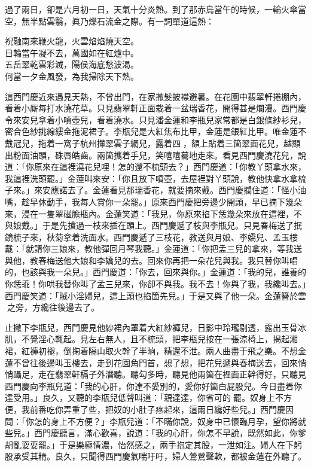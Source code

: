 過了兩日，卻是六月初一日，天氣十分炎熱。到了那赤烏當午的時候，一輪火傘當空，無半點雲翳，眞乃爍石流金之際。有一詞單道這熱：

\begin{myquote}
祝融南來鞭火龍，火雲焰焰燒天空。\\日輪當午凝不去，萬國如在紅爐中。\\五岳翠乾雲彩滅，陽侯海底愁波渴。\\何當一夕金風發，為我掃除天下熱。
\end{myquote}

這西門慶近來遇見天熱，不曾出門，在家撒髮披襟避暑。{}在花園中翡翠軒捲棚內，看着小厮每打水澆花草。只見翡翠軒正面栽着一盆瑞香花，開得甚是爛漫。西門慶令來安兒拿着小噴壺兒，看着澆水。只見潘金蓮和李瓶兒家常都是白銀條紗衫兒，密合色紗挑線縷金拖泥裙子。李瓶兒是大紅焦布比甲，金蓮是銀紅比甲。唯金蓮不戴冠兒，拖着一窩子杭州攆翠雲子網兒，露着四𩬆，額上貼着三箇翠面花兒，越顯出粉面油頭，硃唇皓齒。兩箇攜着手兒，笑嘻嘻驀地走來。看見西門慶澆花兒，說道：「你原來在這裡澆花兒哩！怎的還不梳頭去？」西門慶道：「你教丫頭拿水來，我這裡洗頭罷。」金蓮叫來安：「你且放下噴壺，去屋裡對丫頭說，教他快拿水拿梳子來。」來安應諾去了。金蓮看見那瑞香花，就要摘來戴。{}西門慶攔住道：「怪小油嘴，趁早休動手，我每人賞你一朵罷。」原來西門慶把旁邊少開頭，早已摘下幾朵來，浸在一隻翠磁膽瓶內。金蓮笑道：「我兒，你原來掐下恁幾朵來放在這裡，不與娘戴。」于是先搶過一枝來插在頭上。西門慶遞了枝與李瓶兒。只見春梅送了抿鏡梳子來，秋菊拿着洗面水。西門慶遞了三枝花，教送與月娘、李嬌兒、孟玉樓戴：「就請你三娘來，教他彈回月琴我聽。」金蓮道：「你把孟三兒的拿來，等我送與他，教春梅送他大娘和李嬌兒的去。回來你再把一朵花兒與我。我只替你叫唱的，也該與我一朵兒。」西門慶道：「你去，回來與你。」金蓮道：「我的兒，誰養的你恁乖！你哄我替你叫了孟三兒來，你卻不與我。我不去！你與了我，我纔叫去。」西門慶笑道：「賊小淫婦兒，這上頭也掐箇先兒。」于是又與了他一朵。金蓮簪於雲𩬆之旁，{}方纔往後邊去了。

止撇下李瓶兒，西門慶見他紗裙內罩着大紅紗褲兒，日影中玲瓏剔透，露出玉骨冰肌，不覺淫心輒起。見左右無人，且不梳頭，把李瓶兒按在一張涼椅上，揭起湘裙，紅褲初褪，倒掬着隔山取火幹了半晌，精還不泄。兩人曲盡于飛之樂。不想金蓮不曾往後邊叫玉樓去，走到花園角門首，想了想，把花兒遞與春梅送去，回來悄悄躡足，走在翡翠軒槅子外潛聽。{}聽勾多時，聽見他兩箇在裡面正幹得好，只聽見西門慶向李瓶兒道：「我的心肝，你達不愛別的，愛你好箇白屁股兒。今日盡着你達受用。」良久，又聽的李瓶兒低聲叫道：「親達達，你省可的𢵞罷。奴身上不方便，我前番吃你弄重了些，把奴的小肚子疼起來，這兩日纔好些兒。」西門慶因問：「你怎的身上不方便？」李瓶兒道：「不瞞你說，奴身中已懷臨月孕，{}望你將就些兒。」西門慶聽言，滿心歡喜，說道：「我的心肝，你怎不早說，既然如此，你爹胡亂耍耍罷。」于是樂極情濃，怡然感之，兩手抱定其股，一泄如注。婦人在下躬股承受其精。良久，只聞得西門慶氣喘吁吁，婦人鶯鶯聲軟，都被金蓮在外聽了。

